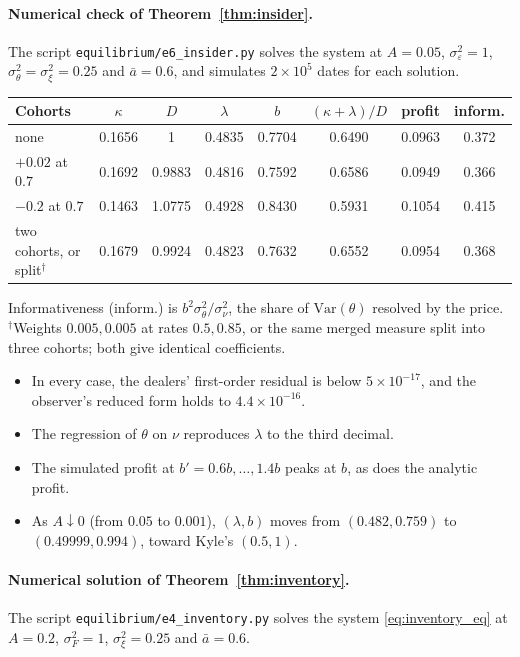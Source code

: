 \paragraph{Numerical check of Theorem~\ref{thm:insider}.} The script \nolinkurl{equilibrium/e6_insider.py} solves the system at $A=0.05$, $\sigma_\varepsilon^2=1$, $\sigma_\theta^2=\sigma_\xi^2=0.25$ and $\bar a=0.6$, and simulates $2\times10^5$ dates for each solution.
\begin{center}\footnotesize\setlength{\tabcolsep}{3pt}
\begin{tabular}{lccccccc}
\hline
Cohorts & $\kappa$ & $D$ & $\lambda$ & $b$ & $(\kappa+\lambda)/D$ & profit & inform.\\
\hline
none & 0.1656 & 1 & 0.4835 & 0.7704 & 0.6490 & 0.0963 & 0.372\\
$+0.02$ at $0.7$ & 0.1692 & 0.9883 & 0.4816 & 0.7592 & 0.6586 & 0.0949 & 0.366\\
$-0.2$ at $0.7$ & 0.1463 & 1.0775 & 0.4928 & 0.8430 & 0.5931 & 0.1054 & 0.415\\
two cohorts, or split$^\dagger$ & 0.1679 & 0.9924 & 0.4823 & 0.7632 & 0.6552 & 0.0954 & 0.368\\
\hline
\end{tabular}
\end{center}
Informativeness (inform.) is $b^2\sigma_\theta^2/\sigma_\nu^2$, the share of $\mathrm{Var}(\theta)$ resolved by the price. $^\dagger$Weights $0.005,0.005$ at rates $0.5,0.85$, or the same merged measure split into three cohorts; both give identical coefficients.
\begin{itemize}[itemsep=1pt,topsep=2pt]
\item In every case, the dealers' first-order residual is below $5\times10^{-17}$, and the observer's reduced form holds to $4.4\times10^{-16}$.
\item The regression of $\theta$ on $\nu$ reproduces $\lambda$ to the third decimal.
\item The simulated profit at $b'=0.6b,\ldots,1.4b$ peaks at $b$, as does the analytic profit.
\item As $A\downarrow0$ (from $0.05$ to $0.001$), $(\lambda,b)$ moves from $(0.482,0.759)$ to $(0.49999,0.994)$, toward Kyle's $(0.5,1)$.
\end{itemize}

\paragraph{Numerical solution of Theorem~\ref{thm:inventory}.} The script \nolinkurl{equilibrium/e4_inventory.py} solves the system \eqref{eq:inventory_eq} at $A=0.2$, $\sigma_F^2=1$, $\sigma_\xi^2=0.25$ and $\bar a=0.6$.

